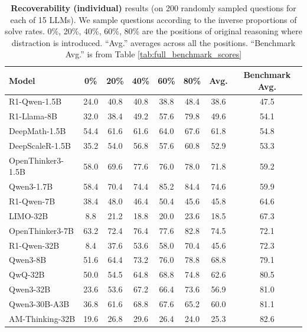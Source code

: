\documentclass{article} %
\begin{document}
\begin{table}[ht!]
  \centering
  \begin{tabular}{lcccccc|c}
    \toprule
    \textbf{Model} & \textbf{0\%} & \textbf{20\%} & \textbf{40\%} & \textbf{60\%} & \textbf{80\%} & \textbf{Avg.} & \textbf{Benchmark Avg.} \\
    \midrule
    R1-Qwen-1.5B    & 24.0 & 40.8 & 40.8 & 38.8 & 48.4 & 38.6 & 47.5 \\
    R1-Llama-8B             & 32.0 & 38.4 & 49.2 & 57.6 & 79.8 & 49.6 & 54.1 \\
    DeepMath-1.5B           & 54.4 & 61.6 & 61.6 & 64.0 & 67.6 & 61.8 & 54.8 \\
    DeepScaleR-1.5B         & 35.2 & 54.0 & 56.8 & 57.6 & 60.8 & 52.9 & 53.3 \\
    OpenThinker3-1.5B       & 58.0 & 69.6 & 77.6 & 76.0 & 78.0 & 71.8 & 59.2 \\
    Qwen3-1.7B              & 58.4 & 70.4 & 74.4 & 85.2 & 84.4 & 74.6 & 59.9 \\
    \midrule
    R1-Qwen-7B      & 38.4 & 48.0 & 46.4 & 50.4 & 45.6 & 45.8 & 64.6 \\
    LIMO-32B                & 8.8 & 21.2 & 18.8 & 20.0 & 23.6 & 18.5 & 67.3 \\
    OpenThinker3-7B         & 63.2 & 72.4 & 76.4 & 77.6 & 82.8 & 74.5 & 72.1 \\
    R1-Qwen-32B     & 8.4 & 37.6 & 53.6 & 58.0 & 70.4 & 45.6 & 72.3 \\
    \midrule
    Qwen3-8B                & 51.6 &  64.4 & 73.2 & 76.0 & 78.8 & 68.8 & 79.1 \\
    QwQ-32B                 & 50.0 & 54.5 & 64.8 & 68.8 & 74.8 & 62.6 & 80.5 \\
    Qwen3-32B               & 23.6 & 53.6 & 67.2 & 66.4 & 73.6 & 56.9 & 81.0 \\
    Qwen3-30B-A3B           & 36.8 & 61.6 & 68.8 & 67.6 & 65.2 & 60.0 & 81.1 \\
    AM-Thinking-32B      & 19.6 & 26.8 & 29.6 & 26.4 & 24.0 & 25.3 & 82.6 \\
    \bottomrule
  \end{tabular}
\caption{\textbf{Recoverability (individual)} results (on 200 randomly sampled questions for each of 15 LLMs). We sample questions according to the inverse proportions of solve rates. 0\%, 20\%, 40\%, 60\%, 80\% are the positions of original reasoning where distraction is introduced. ``Avg.'' averages across all the positions. ``Benchmark Avg.'' is from Table \ref{tab:full_benchmark_scores}}
  \label{tab:recoverability_individual}
\end{table}
\end{document}
